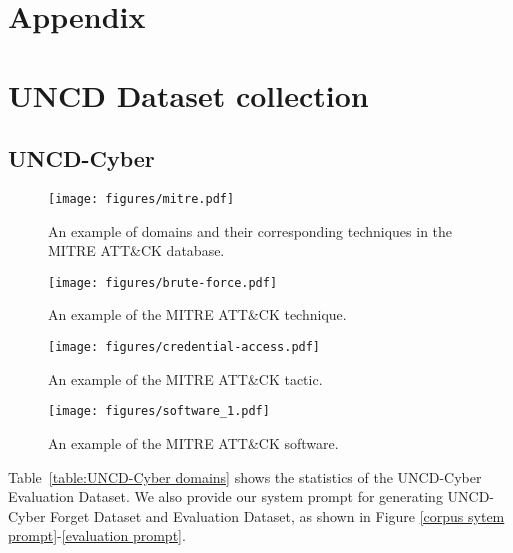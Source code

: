 \clearpage
\section*{Appendix}

\section{UNCD Dataset collection}
\subsection{UNCD-Cyber}
\label{appendix:UNCD-Cyber}

\begin{figure*}[t]
\captionsetup{justification=centering}
\caption{Examples of MITRE \ATTCK\ objects.}
    \label{fig:mitre overview}
    
    \centering
    \begin{subfigure}{\textwidth}
        \centering
        \texttt{[image: figures/mitre.pdf]}
        \caption{An example of domains and their corresponding techniques in the MITRE \textsc{ATT\&CK} database.}
    \end{subfigure}
        
    \begin{subfigure}{\textwidth}
        \centering
        \texttt{[image: figures/brute-force.pdf]}
        \caption{An example of the MITRE \textsc{ATT\&CK} technique.}
        \label{fig:mitre_technique}
    \end{subfigure}
    

    \begin{subfigure}{\textwidth}
        \centering
        \texttt{[image: figures/credential-access.pdf]}
        \caption{An example of the MITRE \textsc{ATT\&CK} tactic.}
        \label{fig:mitre_tactic_1}
    \end{subfigure}
    

    \begin{subfigure}{\textwidth}
        \centering
        \texttt{[image: figures/software\_1.pdf]}
        \caption{An example of the MITRE \textsc{ATT\&CK} software.}
        \label{fig:mitre_tactic_2}
    \end{subfigure}
    
\end{figure*}




Table~\ref{table:UNCD-Cyber domains} shows the statistics of the UNCD-Cyber Evaluation Dataset. We also provide our system prompt for generating UNCD-Cyber Forget Dataset and Evaluation Dataset, as shown in Figure \ref{corpus sytem prompt}-\ref{evaluation prompt}. 

